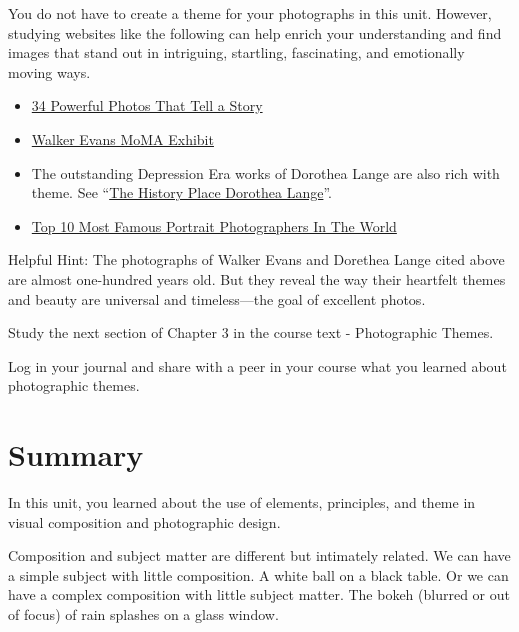 \documentclass[
]{book}
\providecommand{\tightlist}{%
  \setlength{\itemsep}{0pt}\setlength{\parskip}{0pt}}
\begin{document}
You do not have to create a theme for your photographs in this unit. However, studying websites like the following can help enrich your understanding and find images that stand out in intriguing, startling, fascinating, and emotionally moving ways.

\begin{itemize}
\tightlist
\item
  \href{https://www.jotform.com/blog/35-powerful-photos-that-each-tells-a-story/}{34 Powerful Photos That Tell a Story}\\
\item
  \href{https://www.moma.org/artists/1777}{Walker Evans MoMA Exhibit}\\
\item
  The outstanding Depression Era works of Dorothea Lange are also rich with theme. See ``\href{http://www.historyplace.com/unitedstates/lange/}{The History Place Dorothea Lange}''.\\
\item
  \href{https://www.boredpanda.com/top-10-photographers-for-travel-portraits/?utm_source=google\&utm_medium=organic\&utm_campaign=organic}{Top 10 Most Famous Portrait Photographers In The World}
\end{itemize}

Helpful Hint: The photographs of Walker Evans and Dorethea Lange cited above are almost one-hundred years old. But they reveal the way their heartfelt themes and beauty are universal and timeless---the goal of excellent photos.

Study the next section of Chapter 3 in the course text - Photographic Themes.

Log in your journal and share with a peer in your course what you learned about photographic themes.

\hypertarget{summary-2}{%
\section*{Summary}\label{summary-2}}

In this unit, you learned about the use of elements, principles, and theme in visual composition and photographic design.

Composition and subject matter are different but intimately related. We can have a simple subject with little composition. A white ball on a black table. Or we can have a complex composition with little subject matter. The bokeh (blurred or out of focus) of rain splashes on a glass window.
\end{document}
